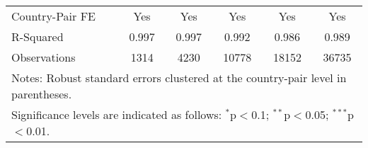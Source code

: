 \begin{table}[htbp]
\begin{adjustbox}{max width=\textwidth}
\begin{tabular}{lccccc}
    Country-Pair FE & Yes & Yes & Yes & Yes & Yes \\
    R-Squared & 0.997 & 0.997 & 0.992 & 0.986 & 0.989 \\
    Observations & 1314 & 4230 & 10778 & 18152 & 36735 \\
    \hline
    \multicolumn{6}{l}{\footnotesize{Notes: Robust standard errors clustered at the country-pair level in parentheses.}} \\
    \multicolumn{6}{l}{\footnotesize{Significance levels are indicated as follows: $^{\ast}$p$<$0.1; $^{\ast\ast}$p$<$0.05; $^{\ast\ast\ast}$p$<$0.01.}} \\
    \end{tabular}
    \end{adjustbox}
\end{table}
